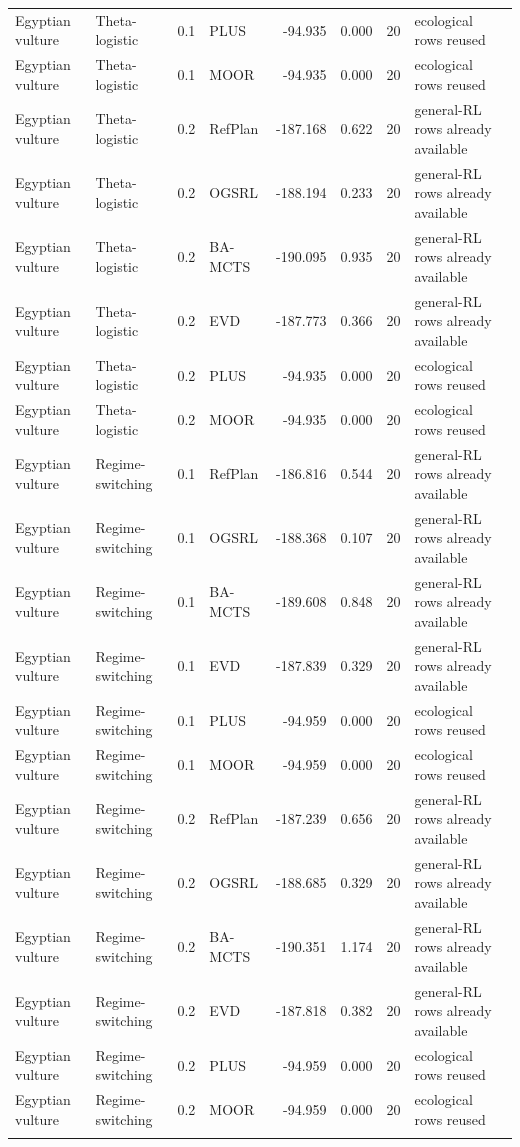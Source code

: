 \documentclass[10pt]{article}
\begin{document}
\begin{landscape}
\begin{center}
\begin{longtable}{@{}llclr rrp{5.2cm}@{}}
Egyptian vulture & Theta-logistic & 0.1 & PLUS & -94.935 & 0.000 & 20 & ecological rows reused \\
Egyptian vulture & Theta-logistic & 0.1 & MOOR & -94.935 & 0.000 & 20 & ecological rows reused \\
\addlinespace[1.5pt]
Egyptian vulture & Theta-logistic & 0.2 & RefPlan & -187.168 & 0.622 & 20 & general-RL rows already available \\
Egyptian vulture & Theta-logistic & 0.2 & OGSRL & -188.194 & 0.233 & 20 & general-RL rows already available \\
Egyptian vulture & Theta-logistic & 0.2 & BA-MCTS & -190.095 & 0.935 & 20 & general-RL rows already available \\
Egyptian vulture & Theta-logistic & 0.2 & EVD & -187.773 & 0.366 & 20 & general-RL rows already available \\
Egyptian vulture & Theta-logistic & 0.2 & PLUS & -94.935 & 0.000 & 20 & ecological rows reused \\
Egyptian vulture & Theta-logistic & 0.2 & MOOR & -94.935 & 0.000 & 20 & ecological rows reused \\
\addlinespace[1.5pt]
Egyptian vulture & Regime-switching & 0.1 & RefPlan & -186.816 & 0.544 & 20 & general-RL rows already available \\
Egyptian vulture & Regime-switching & 0.1 & OGSRL & -188.368 & 0.107 & 20 & general-RL rows already available \\
Egyptian vulture & Regime-switching & 0.1 & BA-MCTS & -189.608 & 0.848 & 20 & general-RL rows already available \\
Egyptian vulture & Regime-switching & 0.1 & EVD & -187.839 & 0.329 & 20 & general-RL rows already available \\
Egyptian vulture & Regime-switching & 0.1 & PLUS & -94.959 & 0.000 & 20 & ecological rows reused \\
Egyptian vulture & Regime-switching & 0.1 & MOOR & -94.959 & 0.000 & 20 & ecological rows reused \\
\addlinespace[1.5pt]
Egyptian vulture & Regime-switching & 0.2 & RefPlan & -187.239 & 0.656 & 20 & general-RL rows already available \\
Egyptian vulture & Regime-switching & 0.2 & OGSRL & -188.685 & 0.329 & 20 & general-RL rows already available \\
Egyptian vulture & Regime-switching & 0.2 & BA-MCTS & -190.351 & 1.174 & 20 & general-RL rows already available \\
Egyptian vulture & Regime-switching & 0.2 & EVD & -187.818 & 0.382 & 20 & general-RL rows already available \\
Egyptian vulture & Regime-switching & 0.2 & PLUS & -94.959 & 0.000 & 20 & ecological rows reused \\
Egyptian vulture & Regime-switching & 0.2 & MOOR & -94.959 & 0.000 & 20 & ecological rows reused \\
\addlinespace[1.5pt]
\end{longtable}
\end{center}
\end{landscape}
\end{document}

